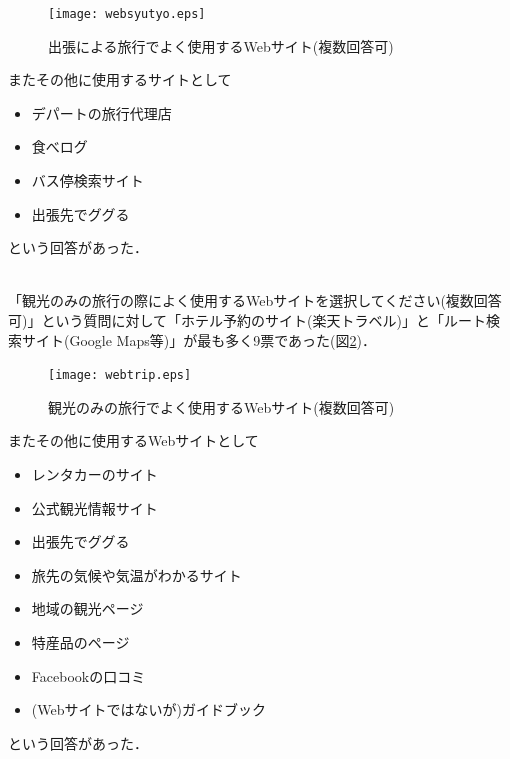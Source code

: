\documentclass{funthesis}
\begin{document}
\begin{figure}[htpb]
\begin{center}
\texttt{[image: websyutyo.eps]}
\end{center}
\caption{出張による旅行でよく使用するWebサイト(複数回答可)}
\label{Lwebsyutyo}
\end{figure}

またその他に使用するサイトとして
\begin{itemize}
 \item デパートの旅行代理店
 \item 食べログ
 \item バス停検索サイト
 \item 出張先でググる
\end{itemize}
という回答があった．\\
　


「観光のみの旅行の際によく使用するWebサイトを選択してください(複数回答可)」という質問に対して「ホテル予約のサイト(楽天トラベル)」と「ルート検索サイト(Google Maps等)」が最も多く9票であった(図\ref{Lwebtrip})．

\begin{figure}[htpb]
\begin{center}
\texttt{[image: webtrip.eps]}
\end{center}
\caption{観光のみの旅行でよく使用するWebサイト(複数回答可)}
\label{Lwebtrip}
\end{figure}


またその他に使用するWebサイトとして
\begin{itemize}
 \item レンタカーのサイト
 \item 公式観光情報サイト
 \item 出張先でググる
 \item 旅先の気候や気温がわかるサイト
 \item 地域の観光ページ
 \item 特産品のページ
 \item Facebookの口コミ
 \item (Webサイトではないが)ガイドブック
\end{itemize}
という回答があった．\\

\end{document}
